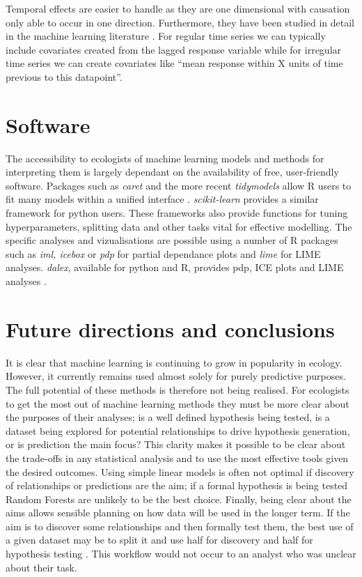 \documentclass[12pt]{article}
\begin{document}
Temporal effects are easier to handle as they are one dimensional with causation only able to occur in one direction.
Furthermore, they have been studied in detail in the machine learning literature \citep{jeong2008non}.
For regular time series we can typically include covariates created from the lagged response variable while for irregular time series we can create covariates like ``mean response within X units of time previous to this datapoint''.

\section{Software}

The accessibility to ecologists of machine learning models and methods for interpreting them is largely dependant on the availability of free, user-friendly software. 
Packages such as \emph{caret} and the more recent \emph{tidymodels} allow R users to fit many models within a unified interface \citep{caret, tidymodels}.
\emph{scikit-learn} provides a similar framework for python users.
These frameworks also provide functions for tuning hyperparameters, splitting data and other tasks vital for effective modelling.
The specific analyses and vizualisations are possible using a number of R packages such as \emph{iml, icebox} or \emph{pdp} for partial dependance plots and \emph{lime} for LIME analyses.
\emph{dalex}, available for python and R, provides pdp, ICE plots and LIME analyses \citep{dalex}.


\section{Future directions and conclusions}\label{future-directions-and-conclusions}

It is clear that machine learning is continuing to grow in popularity in ecology.
However, it currently remains used almost solely for purely predictive purposes.
The full potential of these methods is therefore not being realised.
For ecologists to get the most out of machine learning methods they must be more clear about the purposes of their analyses; is a well defined hypothesis being tested, is a dataset being explored for potential relationships to drive hypothesis generation, or is prediction the main focus?
This clarity makes it possible to be clear about the trade-offs in any statistical analysis and to use the most effective tools given the desired outcomes.
Using simple linear models is often not optimal if discovery of relationships or predictions are the aim; if a formal hypothesis is being tested Random Forests are unlikely to be the best choice.
Finally, being clear about the aims allows sensible planning on how data will be used in the longer term.
If the aim is to discover some relationships and then formally test them, the best use of a given dataset may be to split it and use half for discovery and half for hypothesis testing \citep{gelman2014statistical, nosek2012scientific}.
This workflow would not occur to an analyst who was unclear about their task.
\end{document}
